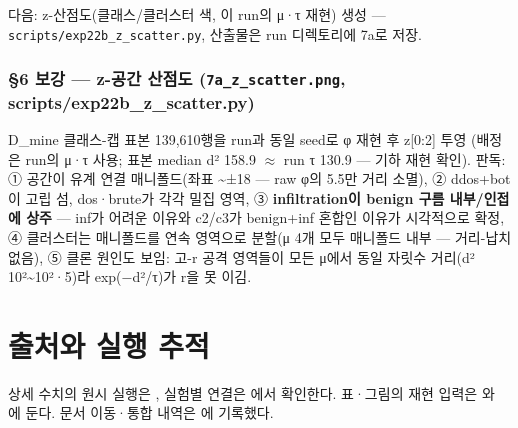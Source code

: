 다음: z-산점도(클래스/\allowbreak{}클러스터 색, 이 run의 μ·τ 재현) 생성 — \texttt{scripts/\allowbreak{}\allowbreak{}exp22b\_\allowbreak{}\allowbreak{}z\allowbreak{}\_\allowbreak{}\allowbreak{}scatter\allowbreak{}.\allowbreak{}py}, 산출물은 run 디렉토리에 7a로 저장.

\subsubsection{§6 보강 — z-공간 산점도 (\texttt{7a\_\allowbreak{}\allowbreak{}z\_\allowbreak{}\allowbreak{}sca\allowbreak{}tter.\allowbreak{}png\allowbreak{}}, scripts/\allowbreak{}exp22b\_\allowbreak{}z\_\allowbreak{}scatter.py)}
D\_\allowbreak{}mine 클래스-캡 표본 139,610행을 run과 동일 seed로 φ 재현 후 z[0:2] 투영 (배정은 run의 μ·τ 사용; 표본 median d² 158.9 \ensuremath{\approx} run τ 130.9 — 기하 재현 확인). 판독: ① 공간이 유계 연결 매니폴드(좌표 \textasciitilde{}±18 — raw φ의 5.5만 거리 소멸), ② ddos+\allowbreak{}bot이 고립 섬, dos·brute가 각각 밀집 영역, ③ \textbf{infiltration이 benign 구름 내부/\allowbreak{}인접에 상주} — inf가 어려운 이유와 c2/\allowbreak{}c3가 benign+\allowbreak{}inf 혼합인 이유가 시각적으로 확정, ④ 클러스터는 매니폴드를 연속 영역으로 분할(μ 4개 모두 매니폴드 내부 — 거리-납치 없음), ⑤ 클론 원인도 보임: 고-r 공격 영역들이 모든 μ에서 동일 자릿수 거리(d² 10²\textasciitilde{}10²·5)라 exp(−d²/\allowbreak{}τ)가 r을 못 이김.



\section*{출처와 실행 추적}

상세 수치의 원시 실행은 , 실험별 연결은 에서 확인한다. 표·그림의 재현 입력은 와 에 둔다. 문서 이동·통합 내역은 에 기록했다.


